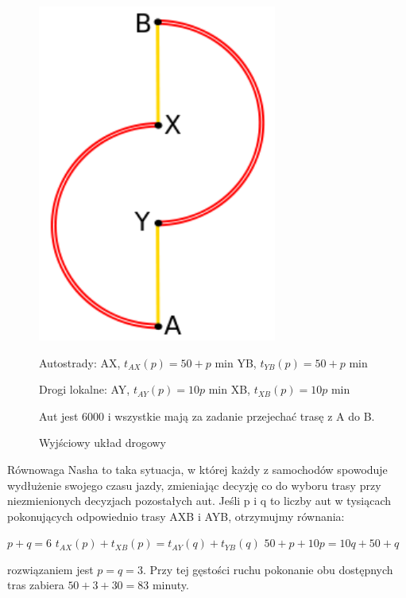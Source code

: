 \documentclass[twoside,12pt]{report}
\begin{document}
\begin{figure}[ht]
\centering
\begin{minipage}{.48\textwidth}
\centering

\includegraphics[width=0.7\textwidth]{img/braess1}
\caption{Wyjściowy układ drogowy}

\end{minipage}\hfill
\begin{minipage}{.48\textwidth}
Autostrady:
AX, $t_{AX}(p) =  50 + p$ min
YB, $t_{YB}(p) =  50 + p$ min

Drogi lokalne:
AY, $t_{AY}(p) =  10p$ min
XB, $t_{XB}(p) =  10p$ min

Aut jest 6000 i wszystkie mają za zadanie przejechać trasę z A do B.
\end{minipage}\hfill
\end{figure}


Równowaga Nasha to taka sytuacja, w której każdy z samochodów spowoduje wydłużenie swojego czasu jazdy, zmieniając decyzję co do wyboru trasy przy niezmienionych decyzjach pozostałych aut.
\newline\newline
Jeśli p i q to liczby aut w tysiącach pokonujących odpowiednio trasy AXB i AYB, otrzymujmy równania:

\begin{center}
$p+q = 6 $
$t_{AX}(p)+t_{XB}(p) = t_{AY}(q) + t_{YB}(q)$
$50+p+10p = 10q+50+q$
\end{center}
rozwiązaniem jest $p=q=3$.
Przy tej gęstości ruchu pokonanie obu dostępnych tras zabiera $50+3+30=83$ minuty.
\end{document}
